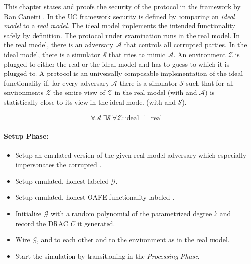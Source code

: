 \label{sec:security}

This chapter states and proofs the security of the protocol in the
 framework by Ran Canetti \cite{canetti05}.
In the UC framework security is defined by comparing an \emph{ideal model} to a
\emph{real model}. The ideal model implements the intended functionality
\JWfuncSym{}{} safely by definition. The protocol under examination runs in the
real model. In the real model, there is an adversary $\mathcal{A}$ that controls
all corrupted parties.  In the ideal model, there is a simulator $\mathcal{S}$
that tries to mimic $\mathcal{A}$. An environment $\mathcal{Z}$ is plugged to
either the real or the ideal model and has to guess to which it is plugged to. A
protocol \JWprotoSym{}{} is an universally composable implementation of the
ideal functionality if, for every adversary $\mathcal{A}$ there is a
simulator $\mathcal{S}$ such that for all environments $\mathcal{Z}$ the entire
view of $\mathcal{Z}$ in the real model (with \JWprotoSym{}{} and $\mathcal{A}$)
is statistically close to its view in the ideal model (with \JWfuncSym{}{} and
$\mathcal{S}$).

\begin{align*}
%
\forall \mathcal{A}\ \exists \mathcal{S}\ \forall \mathcal{Z} :
\text{ideal}\ \widetilde{=}\ \text{real}
%
\end{align*}

%
%
\label{sec:simulators}


\label{sec:simulator-david}

\paragraph{Setup Phase:}

\begin{itemize}

  \item Setup an emulated version of the given real model adversary
    \JWadv{} which especially impersonates the corrupted \JWpTwo{}.

  \item Setup emulated, honest \JWpOne{} labeled $\mathcal{G}$.

  \item Setup emulated, honest OAFE functionality labeled \JWfuncSymOAFE{}.

  \item Initialize $\mathcal{G}$ with a random polynomial of the parametrized
    degree $k$ and record the DRAC $C$ it generated.

  \item Wire $\mathcal{G}$, \JWfuncSymOAFE{} and \JWadv{} to each other
    and \JWadv{} to the environment as in the real model.

  \item Start the simulation by transitioning in the \emph{Processing Phase}.

\end{itemize}

